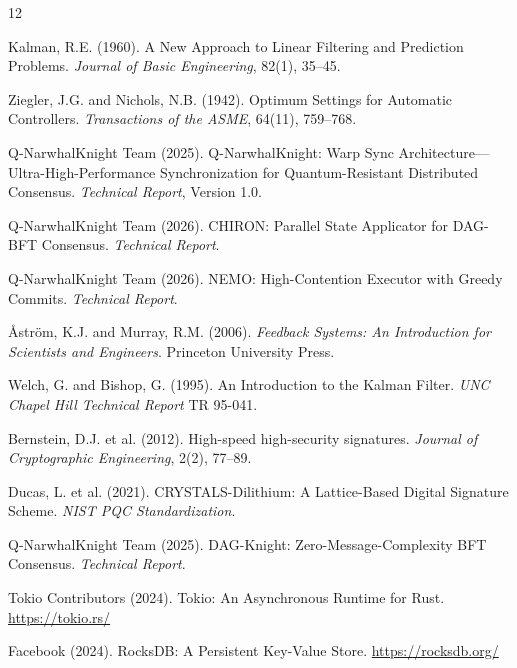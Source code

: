 \documentclass[11pt,a4paper]{article}
\begin{document}
\begin{thebibliography}{12}

Kalman, R.E. (1960). A New Approach to Linear Filtering and Prediction Problems. \textit{Journal of Basic Engineering}, 82(1), 35--45.

Ziegler, J.G. and Nichols, N.B. (1942). Optimum Settings for Automatic Controllers. \textit{Transactions of the ASME}, 64(11), 759--768.

Q-NarwhalKnight Team (2025). Q-NarwhalKnight: Warp Sync Architecture---Ultra-High-Performance Synchronization for Quantum-Resistant Distributed Consensus. \textit{Technical Report}, Version 1.0.

Q-NarwhalKnight Team (2026). CHIRON: Parallel State Applicator for DAG-BFT Consensus. \textit{Technical Report}.

Q-NarwhalKnight Team (2026). NEMO: High-Contention Executor with Greedy Commits. \textit{Technical Report}.

\r{A}str\"{o}m, K.J. and Murray, R.M. (2006). \textit{Feedback Systems: An Introduction for Scientists and Engineers}. Princeton University Press.

Welch, G. and Bishop, G. (1995). An Introduction to the Kalman Filter. \textit{UNC Chapel Hill Technical Report} TR 95-041.

Bernstein, D.J. et al. (2012). High-speed high-security signatures. \textit{Journal of Cryptographic Engineering}, 2(2), 77--89.

Ducas, L. et al. (2021). CRYSTALS-Dilithium: A Lattice-Based Digital Signature Scheme. \textit{NIST PQC Standardization}.

Q-NarwhalKnight Team (2025). DAG-Knight: Zero-Message-Complexity BFT Consensus. \textit{Technical Report}.

Tokio Contributors (2024). Tokio: An Asynchronous Runtime for Rust. \url{https://tokio.rs/}

Facebook (2024). RocksDB: A Persistent Key-Value Store. \url{https://rocksdb.org/}

\end{thebibliography}
\end{document}
